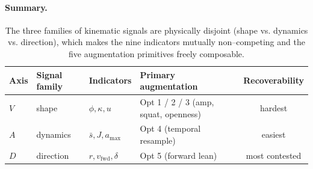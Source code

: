 \paragraph{Summary.}
\begin{table}[h]
  \centering\small
  \begin{tabular}{@{}llllc@{}}
    \toprule
    Axis & Signal family & Indicators & Primary augmentation & Recoverability \\
    \midrule
    $V$ & shape    & $\phi,\kappa,u$              & Opt 1 / 2 / 3 (amp, squat, openness) & hardest \\
    $A$ & dynamics & $\bar s,J,a_{\max}$          & Opt 4 (temporal resample)            & easiest \\
    $D$ & direction & $r,v_{\text{fwd}},\delta$    & Opt 5 (forward lean)                 & most contested \\
    \bottomrule
  \end{tabular}
  \caption{The three families of kinematic signals are physically
           disjoint (shape vs. dynamics vs. direction), which makes the
           nine indicators mutually non--competing and the five
           augmentation primitives freely composable.}
  \label{tab:vad-axes-summary}
\end{table}

\endinput

